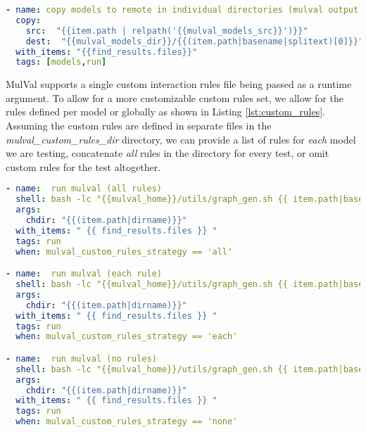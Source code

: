 \begin{minipage}{\linewidth}
\begin{lstlisting}[language=yaml, label={lst:model_dirs}, caption={MulVal distinct run dirs},captionpos=b, linewidth=.6\textwidth]
- name: copy models to remote in individual directories (mulval output is noisy)
  copy:
    src:  "{{item.path | relpath('{{mulval_models_src}}')}}"
    dest:  "{{mulval_models_dir}}/{{(item.path|basename|splitext)[0]}}"
  with_items: "{{find_results.files}}"
  tags: [models,run]
\end{lstlisting}
\end{minipage}

MulVal supports a single custom interaction rules file being passed as a runtime argument. To allow for a more customizable custom rules set, we allow for the rules defined per model or globally as shown in Listing \ref{lst:custom_rules}. Assuming the custom rules are defined in separate files in the \textit{mulval\_custom\_rules\_dir} directory, we can provide a list of rules for \textit{each} model we are testing, concatenate \textit{all} rules in the directory for every test, or omit custom rules for the test altogether.

\begin{minipage}{\linewidth}
\begin{lstlisting}[language=yaml, label={lst:custom_rules}, caption={MulVal custom rule strategies},captionpos=b, linewidth=.6\textwidth]
- name:  run mulval (all rules)
  shell: bash -lc "{{mulval_home}}/utils/graph_gen.sh {{ item.path|basename }} -p -v -a {{mulval_custom_rules_dir}}/custom_rules.P "
  args:
    chdir: "{{(item.path|dirname)}}"
  with_items: " {{ find_results.files }} "
  tags: run
  when: mulval_custom_rules_strategy == 'all'

- name:  run mulval (each rule)
  shell: bash -lc "{{mulval_home}}/utils/graph_gen.sh {{ item.path|basename }} -p -v -a {{mulval_custom_rules_dir}}/{{ item.path|basename }}.rules  "
  args:
    chdir: "{{(item.path|dirname)}}"
  with_items: " {{ find_results.files }} "
  tags: run
  when: mulval_custom_rules_strategy == 'each'

- name:  run mulval (no rules)
  shell: bash -lc "{{mulval_home}}/utils/graph_gen.sh {{ item.path|basename }} -p -v"
  args:
    chdir: "{{(item.path|dirname)}}"
  with_items: " {{ find_results.files }} "
  tags: run
  when: mulval_custom_rules_strategy == 'none'

\end{lstlisting}
\end{minipage}

